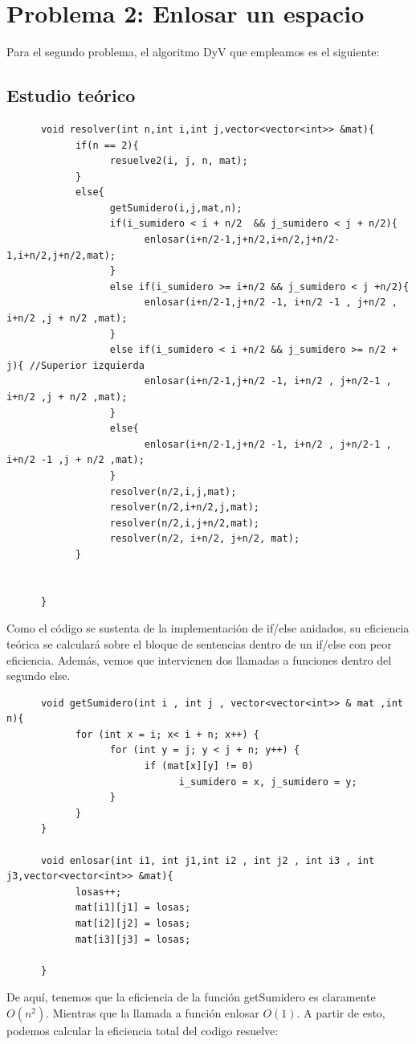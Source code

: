 \documentclass[11pt,openany]{book}
\begin{document}
\section{Problema 2: Enlosar un espacio }
Para el segundo problema, el algoritmo DyV que empleamos es el siguiente:
\subsection{Estudio teórico}
\begin{lstlisting}
      void resolver(int n,int i,int j,vector<vector<int>> &mat){
            if(n == 2){
                  resuelve2(i, j, n, mat);
            }
            else{
                  getSumidero(i,j,mat,n);
                  if(i_sumidero < i + n/2  && j_sumidero < j + n/2){
                        enlosar(i+n/2-1,j+n/2,i+n/2,j+n/2-1,i+n/2,j+n/2,mat);
                  }
                  else if(i_sumidero >= i+n/2 && j_sumidero < j +n/2){ 
                        enlosar(i+n/2-1,j+n/2 -1, i+n/2 -1 , j+n/2 , i+n/2 ,j + n/2 ,mat);
                  }
                  else if(i_sumidero < i +n/2 && j_sumidero >= n/2 + j){ //Superior izquierda
                        enlosar(i+n/2-1,j+n/2 -1, i+n/2 , j+n/2-1 , i+n/2 ,j + n/2 ,mat);
                  }
                  else{
                        enlosar(i+n/2-1,j+n/2 -1, i+n/2 , j+n/2-1 , i+n/2 -1 ,j + n/2 ,mat);
                  }
                  resolver(n/2,i,j,mat);
                  resolver(n/2,i+n/2,j,mat);
                  resolver(n/2,i,j+n/2,mat);
                  resolver(n/2, i+n/2, j+n/2, mat);
            }


      }
\end{lstlisting}

Como el código se sustenta de la implementación de if/else anidados, su eficiencia teórica se calculará
sobre el bloque de sentencias dentro de un if/else con peor eficiencia. Además, vemos que intervienen
dos llamadas a funciones dentro del segundo else.

\begin{lstlisting}
      void getSumidero(int i , int j , vector<vector<int>> & mat ,int n){
            for (int x = i; x< i + n; x++) {
                  for (int y = j; y < j + n; y++) {
                        if (mat[x][y] != 0)
                              i_sumidero = x, j_sumidero = y;
                  }   
            }
      }

      void enlosar(int i1, int j1,int i2 , int j2 , int i3 , int j3,vector<vector<int>> &mat){
            losas++;
            mat[i1][j1] = losas;
            mat[i2][j2] = losas;
            mat[i3][j3] = losas;

      }
\end{lstlisting}
De aquí, tenemos que la eficiencia de la función getSumidero es claramente $O(n^2)$. Mientras que la llamada
a función enlosar $O(1)$. A partir de esto, podemos calcular la eficiencia total del codigo resuelve:
\end{document}
